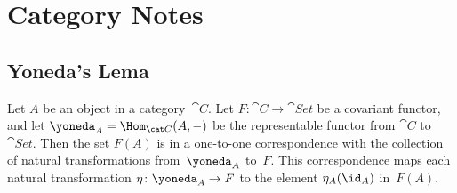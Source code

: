 \chapter{Category Notes}

\section{Yoneda's Lema}

\begin{thm}\label{thm:yoneda-general}
    {} Let\/ $A$ be an object in a category\/~$\cat C$. Let\/ $F\colon\cat C\to\cat{Set}$ be a covariant functor, and let\/ $\yoneda_A=\Hom_{\cat C}(A,-)$ be the representable functor from\/ $\cat C$ to\/ $\cat{Set}$. Then the set\/ $F(A)$ is in a one-to-one correspondence with the collection of natural transformations from\/~$\yoneda_A$ to\/~$F$. This correspondence maps each natural transformation\/ $\eta\colon\yoneda_A\to F$ to the element\/ $\eta_A(\id_A)$ in\/~$F(A)$.
\end{thm}

